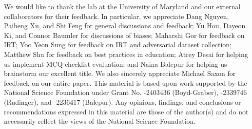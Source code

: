 We would like to thank the  lab at the University of Maryland and our external collaborators for their feedback.
In particular, we appreciate Dang Nguyen, Paiheng Xu, and Shi Feng for general discussions and feedback; Yu Hou, Dayeon Ki, and Connor Baumler for discussions of biases; Maharshi Gor for feedback on IRT; Yoo Yeon Sung for feedback on IRT and adversarial dataset collection; Matthew Shu for feedback on best practices in education; Atrey Desai for helping us implement MCQ checklist evaluation; and Naina Balepur for helping us brainstorm our excellent title.
We also sincerely appreciate Michael Saxon for feedback on our entire paper.
This material is based upon work supported by the National Science Foundation under Grant No. -2403436 (Boyd-Graber), -2339746 (Rudinger), and -2236417 (Balepur).
Any opinions, findings, and conclusions or recommendations expressed in this material are those of the author(s) and do not necessarily reflect the views of the National Science Foundation.

